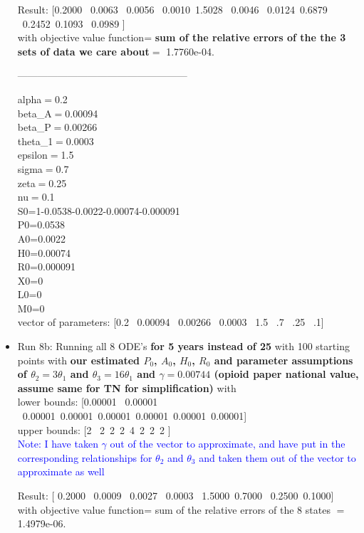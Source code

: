 \documentclass[12pt]{article}
\begin{document}
\begin{itemize}
Result: [0.2000 \   0.0063  \  0.0056 \   0.0010\    1.5028  \  0.0046 \   0.0124\    0.6879 \   0.2452\ 0.1093 \   0.0989
 ] \\
with objective value function= \textbf{sum of the relative errors of the the 3 sets of data we care about}$=$  1.7760e-04. 



---------------------------------------------------

\pagebreak


alpha$=$0.2 \\
beta\_{A}$=$0.00094 \\
beta\_{P}$=$0.00266 \\
theta\_{1}$=$0.0003 \\
epsilon$=$1.5 \\
sigma$=$0.7 \\
zeta$=$0.25 \\
nu$=$0.1 \\

S0=1-0.0538-0.0022-0.00074-0.000091 \\
P0=0.0538 \\
A0=0.0022 \\
H0=0.00074 \\
R0=0.000091 \\
X0=0 \\
L0=0 \\
M0=0 \\

vector of parameters: [0.2 \ 0.00094 \ 0.00266 \ 0.0003 \ 1.5 \ .7 \ .25 \ .1]

\item Run 8b: Running all 8 ODE's \textbf{for 5 years instead of 25} with 100 starting points with \textbf{our estimated $P_0$, $A_0$, $H_0$, $R_0$ and parameter assumptions of $\theta_2=3 \theta_1$ and $\theta_3=16\theta_1$ and $\gamma=0.00744$ (opioid paper national value, assume same for TN for simplification)} with \\
lower bounds: [0.00001  \ 0.00001 \ 0.00001\ 0.00001\ 0.00001\ 0.00001\ 0.00001\ 0.00001] \\
upper bounds: [2 \ 2\  2\  2\  4\  2\  2\   2 ] \\
\textcolor{blue}{Note: I have taken $\gamma$ out of the vector to approximate, and have put in the corresponding relationships for $\theta_2$ and $\theta_3$ and taken them out of the vector to approximate as well}

Result: [ 0.2000 \   0.0009  \  0.0027 \   0.0003  \  1.5000\    0.7000 \   0.2500\    0.1000] \\
with objective value function= sum of the relative errors of the 8 states $=$   1.4979e-06.



\end{itemize}
\end{document}
